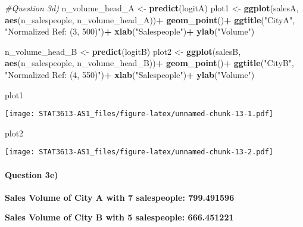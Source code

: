 \documentclass[]{article}
\newenvironment{Shaded}{\begin{snugshade}}{\end{snugshade}}
\newcommand{\CommentTok}[1]{\textcolor[rgb]{0.56,0.35,0.01}{\textit{#1}}}
\newcommand{\KeywordTok}[1]{\textcolor[rgb]{0.13,0.29,0.53}{\textbf{#1}}}
\newcommand{\NormalTok}[1]{#1}
\newcommand{\OperatorTok}[1]{\textcolor[rgb]{0.81,0.36,0.00}{\textbf{#1}}}
\newcommand{\StringTok}[1]{\textcolor[rgb]{0.31,0.60,0.02}{#1}}
\let\oldparagraph\paragraph
\renewcommand{\paragraph}[1]{\oldparagraph{#1}\mbox{}}
\begin{document}
\begin{Shaded}
\begin{Highlighting}[]
\CommentTok{#Question 3d)}
\NormalTok{n_volume_head_A <-}\StringTok{ }\KeywordTok{predict}\NormalTok{(logitA)}
\NormalTok{plot1 <-}\StringTok{ }\KeywordTok{ggplot}\NormalTok{(salesA, }\KeywordTok{aes}\NormalTok{(n_salespeople, n_volume_head_A))}\OperatorTok{+}
\StringTok{  }\KeywordTok{geom_point}\NormalTok{()}\OperatorTok{+}
\StringTok{  }\KeywordTok{ggtitle}\NormalTok{(}\StringTok{"CityA"}\NormalTok{, }\StringTok{"Normalized Ref: (3, 500)"}\NormalTok{)}\OperatorTok{+}
\StringTok{  }\KeywordTok{xlab}\NormalTok{(}\StringTok{"Salespeople"}\NormalTok{)}\OperatorTok{+}
\StringTok{  }\KeywordTok{ylab}\NormalTok{(}\StringTok{"Volume"}\NormalTok{)}

\NormalTok{n_volume_head_B <-}\StringTok{ }\KeywordTok{predict}\NormalTok{(logitB)}
\NormalTok{plot2 <-}\StringTok{ }\KeywordTok{ggplot}\NormalTok{(salesB, }\KeywordTok{aes}\NormalTok{(n_salespeople, n_volume_head_B))}\OperatorTok{+}
\StringTok{  }\KeywordTok{geom_point}\NormalTok{()}\OperatorTok{+}
\StringTok{  }\KeywordTok{ggtitle}\NormalTok{(}\StringTok{"CityB"}\NormalTok{, }\StringTok{"Normalized Ref: (4, 550)"}\NormalTok{)}\OperatorTok{+}
\StringTok{  }\KeywordTok{xlab}\NormalTok{(}\StringTok{"Salespeople"}\NormalTok{)}\OperatorTok{+}
\StringTok{  }\KeywordTok{ylab}\NormalTok{(}\StringTok{"Volume"}\NormalTok{)}

\NormalTok{plot1}
\end{Highlighting}
\end{Shaded}

\texttt{[image: STAT3613-AS1\_files/figure-latex/unnamed-chunk-13-1.pdf]}

\begin{Shaded}
\begin{Highlighting}[]
\NormalTok{plot2}
\end{Highlighting}
\end{Shaded}

\texttt{[image: STAT3613-AS1\_files/figure-latex/unnamed-chunk-13-2.pdf]}

\hypertarget{question-3e}{%
\paragraph{Question 3e)}\label{question-3e}}

\textbf{Sales Volume of City A with 7 salespeople: 799.491596}

\textbf{Sales Volume of City B with 5 salespeople: 666.451221}
\end{document}
